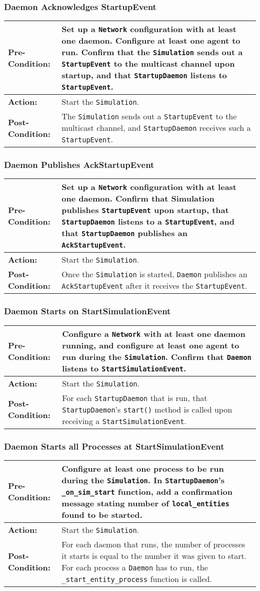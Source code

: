\documentclass[titlepage]{article}
\newcommand{\testcase}[3]{
    \begin{center}
    \begin{tabular}{| l | p{0.7\textwidth}|}
        \hline
        \rowcolor[gray]{0.8}\textbf{Pre-Condition:} & #1 \\ \hline
        \textbf{Action:} & #2 \\ \hline
        \rowcolor[gray]{0.8}\textbf{Post-Condition:} & #3 \\ \hline
    \end{tabular}
    \end{center}
}
\begin{document}
\subsubsection{Daemon Acknowledges StartupEvent}
\testcase{Set up a \texttt{Network} configuration with at least one daemon.  Configure at least one agent to run.  Confirm that the \texttt{Simulation} sends out a \texttt{StartupEvent} to the multicast channel upon startup, and that \texttt{StartupDaemon} listens to \texttt{StartupEvent}.}{Start the \texttt{Simulation}.}{The \texttt{Simulation} sends out a \texttt{StartupEvent} to the multicast channel, and \texttt{StartupDaemon} receives such a \texttt{StartupEvent}.}

\subsubsection{Daemon Publishes AckStartupEvent}
\testcase{Set up a \texttt{Network} configuration with at least one daemon.  Confirm that Simulation publishes \texttt{StartupEvent} upon startup, that \texttt{StartupDaemon} listens to a \texttt{StartupEvent}, and that \texttt{StartupDaemon} publishes an \texttt{AckStartupEvent}.}{Start the \texttt{Simulation}.}{Once the \texttt{Simulation} is started, \texttt{Daemon} publishes an \texttt{AckStartupEvent} after it receives the \texttt{StartupEvent}.}

\subsubsection{Daemon Starts on StartSimulationEvent}
\testcase{Configure a \texttt{Network} with at least one daemon running, and configure at least one agent to run during the \texttt{Simulation}.  Confirm that \texttt{Daemon} listens to \texttt{StartSimulationEvent}.}{Start the \texttt{Simulation}.}{For each \texttt{StartupDaemon} that is run, that \texttt{StartupDaemon}'s \texttt{start()} method is called upon receiving a \texttt{StartSimulationEvent}.}

\subsubsection{Daemon Starts all Processes at StartSimulationEvent}
\testcase{Configure at least one process to be run during the \texttt{Simulation}.  In \texttt{StartupDaemon}'s \texttt{\_on\_sim\_start} function, add a confirmation message stating number of \texttt{local\_entities} found to be started.}{Start the \texttt{Simulation}.}{For each daemon that runs, the number of processes it starts is equal to the number it was given to start.  For each process a \texttt{Daemon} has to run, the \texttt{\_start\_entity\_process} function is called.}
\end{document}

